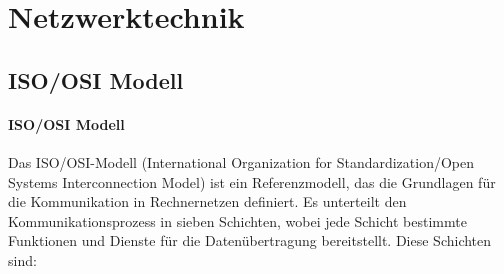 \section{Netzwerktechnik}
\label{sec:Netzwerktechnik}

\subsection{ISO/OSI Modell}

\paragraph{ISO/OSI Modell} Das ISO/OSI-Modell (International Organization for Standardization/Open Systems Interconnection Model) ist ein Referenzmodell, das die Grundlagen für die Kommunikation in Rechnernetzen definiert. Es unterteilt den Kommunikationsprozess in sieben Schichten, wobei jede Schicht bestimmte Funktionen und Dienste für die Datenübertragung bereitstellt. Diese Schichten sind:
